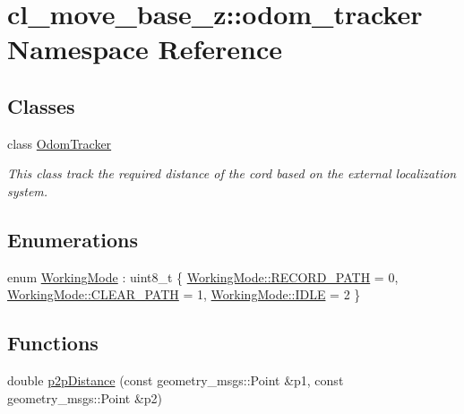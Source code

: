 \hypertarget{namespacecl__move__base__z_1_1odom__tracker}{}\section{cl\+\_\+move\+\_\+base\+\_\+z\+:\+:odom\+\_\+tracker Namespace Reference}
\label{namespacecl__move__base__z_1_1odom__tracker}
\subsection*{Classes}
\begin{DoxyCompactItemize}
\item 
class \hyperlink{classcl__move__base__z_1_1odom__tracker_1_1OdomTracker}{Odom\+Tracker}
\begin{DoxyCompactList}\small\item\em This class track the required distance of the cord based on the external localization system. \end{DoxyCompactList}\end{DoxyCompactItemize}
\subsection*{Enumerations}
\begin{DoxyCompactItemize}
\item 
enum \hyperlink{namespacecl__move__base__z_1_1odom__tracker_ac46b05813b2791604f6cd0a39ace3ef8}{Working\+Mode} \+: uint8\+\_\+t \{ \hyperlink{namespacecl__move__base__z_1_1odom__tracker_ac46b05813b2791604f6cd0a39ace3ef8a023bc3adf68871ef7a0c616765ac80a7}{Working\+Mode\+::\+R\+E\+C\+O\+R\+D\+\_\+\+P\+A\+TH} = 0, 
\hyperlink{namespacecl__move__base__z_1_1odom__tracker_ac46b05813b2791604f6cd0a39ace3ef8a68783989ae56d7f2f9496c66c417a192}{Working\+Mode\+::\+C\+L\+E\+A\+R\+\_\+\+P\+A\+TH} = 1, 
\hyperlink{namespacecl__move__base__z_1_1odom__tracker_ac46b05813b2791604f6cd0a39ace3ef8aa5daf7f2ebbba4975d61dab1c40188c7}{Working\+Mode\+::\+I\+D\+LE} = 2
 \}
\end{DoxyCompactItemize}
\subsection*{Functions}
\begin{DoxyCompactItemize}
\item 
double \hyperlink{namespacecl__move__base__z_1_1odom__tracker_a501582a760a02ce0069d95bfc67ca973}{p2p\+Distance} (const geometry\+\_\+msgs\+::\+Point \&p1, const geometry\+\_\+msgs\+::\+Point \&p2)
\end{DoxyCompactItemize}


